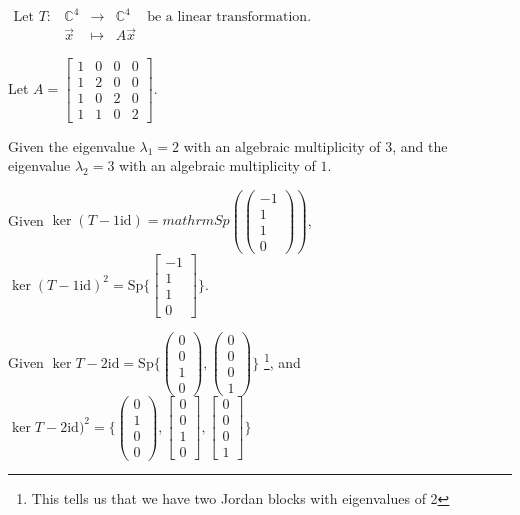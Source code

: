 \documentclass[11pt,fleqn]{book}
\begin{document}
    \begin{example}
    {~~~}
    
        $\begin{matrix} \text{Let } T: &\mathbb{C}^4 &\to &\mathbb{C}^4 &\text{be a linear transformation. } \\ &\vec{x} &\mapsto &A\vec{x}  \end{matrix}$
        
        Let $A = \begin{bmatrix} 1 &0 &0 &0 \\ 1 &2 &0 &0 \\ 1 &0 &2 &0 \\ 1 &1 &0 &2 \end{bmatrix}$. 
        
        Given the eigenvalue $\lambda_1 = 2$ with an algebraic multiplicity of $3$, and the eigenvalue $\lambda_2 = 3$ with an algebraic multiplicity of $1$. 
        
        Given $\ker(T - 1\mathrm{id}) = mathrm{Sp}(\begin{pmatrix} -1 \\ 1 \\ 1 \\ 0 \end{pmatrix})$, $\ker(T - 1\mathrm{id})^2 = \mathrm{Sp}\{\begin{bmatrix} -1 \\ 1 \\ 1 \\ 0 \end{bmatrix}\}$. 
        
        Given $\ker{T - 2\mathrm{id}} = \mathrm{Sp}\{\begin{pmatrix} 0 \\ 0 \\ 1 \\ 0 \end{pmatrix}, \begin{pmatrix} 0 \\ 0 \\ 0 \\ 1 \end{pmatrix}\}$ \footnote{This tells us that we have two Jordan blocks with eigenvalues of 2}, and $\ker T - 2\mathrm{id})^2 = \{\begin{pmatrix} 0\\1\\0\\0 \end{pmatrix}, \begin{bmatrix}0\\0\\1\\0 \end{bmatrix}, \begin{bmatrix} 0\\0\\0\\1 \end{bmatrix}\}$
        

\end{example}
\end{document}
